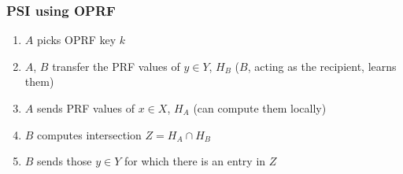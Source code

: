 \subsubsection{PSI using OPRF}

\begin{enumerate}
		\item $A$ picks OPRF key $k$
		\item $A$, $B$ transfer the PRF values of $y \in Y$, $H_B$ ($B$, acting
				as the recipient, learns them)
		\item $A$ sends PRF values of $x \in X$, $H_A$ (can compute them locally)
		\item $B$ computes intersection $Z = H_A \cap H_B$
		\item $B$ sends those $y \in Y$ for which there is an entry in $Z$
\end{enumerate}

